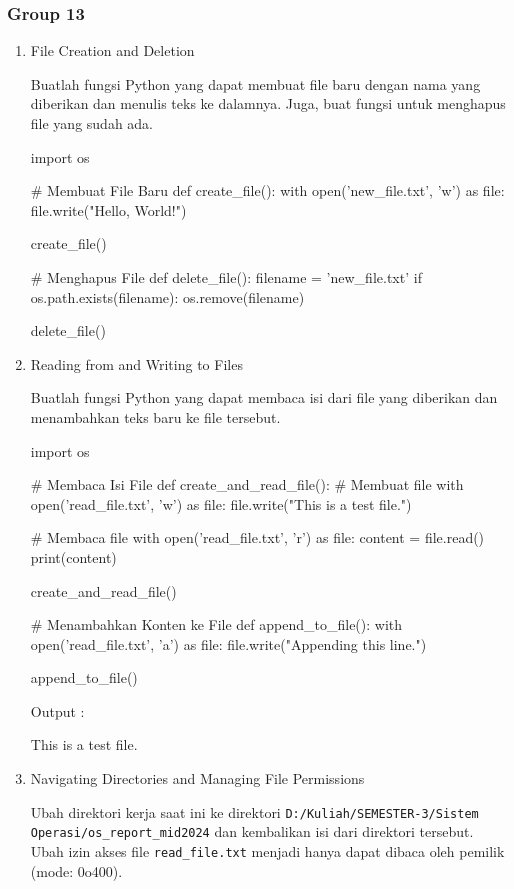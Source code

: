 \documentclass[12pt]{article}
\begin{document}
\subsubsection{Group 13}
\begin{enumerate}
    \item File Creation and Deletion
        \par Buatlah fungsi Python yang dapat membuat file baru dengan nama yang diberikan dan menulis teks ke dalamnya. Juga, buat fungsi untuk menghapus file yang sudah ada.
\begin{python}
import os

# Membuat File Baru
def create_file():
    with open('new_file.txt', 'w') as file:
        file.write("Hello, World!")

create_file()

# Menghapus File
def delete_file():
    filename = 'new_file.txt'
    if os.path.exists(filename):
        os.remove(filename)

delete_file()
\end{python}
        
    \item Reading from and Writing to Files
        \par  Buatlah fungsi Python yang dapat membaca isi dari file yang diberikan dan menambahkan teks baru ke file tersebut.
\begin{python}
import os

# Membaca Isi File
def create_and_read_file():
    # Membuat file
    with open('read_file.txt', 'w') as file:
        file.write("This is a test file.")
    
    # Membaca file
    with open('read_file.txt', 'r') as file:
        content = file.read()
        print(content)

create_and_read_file()

# Menambahkan Konten ke File
def append_to_file():
    with open('read_file.txt', 'a') as file:
        file.write("Appending this line.\n")

append_to_file()
\end{python}
    \par Output :
    \par This is a test file.

    \item Navigating Directories and Managing File Permissions
        \par Ubah direktori kerja saat ini ke direktori \texttt{D:/Kuliah/SEMESTER-3/Sistem Operasi/os\_report\_mid2024} dan kembalikan isi dari direktori tersebut. Ubah izin akses file \texttt{read\_file.txt} menjadi hanya dapat dibaca oleh pemilik (mode: 0o400).


\end{enumerate}
\end{document}
